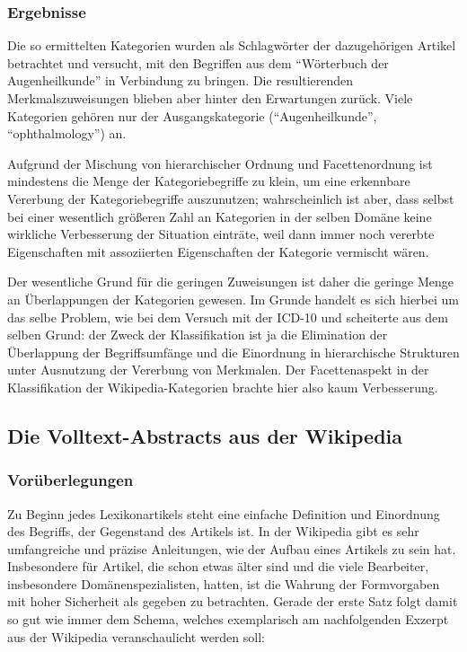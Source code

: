\documentclass[pagesize,DIV=calc,12pt,final]{scrreprt}
\begin{document}
\subsubsection{Ergebnisse}

Die so ermittelten Kategorien wurden als Schlagwörter der dazugehörigen Artikel betrachtet und versucht, mit den Begriffen aus dem \enquote{Wörterbuch der Augenheilkunde} in Verbindung zu bringen. 
Die resultierenden Merkmalszuweisungen blieben aber hinter den Erwartungen zurück. 
Viele Kategorien gehören nur der Ausgangskategorie (\enquote{Augenheilkunde}, \enquote{ophthalmology}) an. 

Aufgrund der Mischung von hierarchischer Ordnung und Facettenordnung ist mindestens die Menge der Kategoriebegriffe zu klein, um eine erkennbare Vererbung der Kategoriebegriffe auszunutzen; wahrscheinlich ist aber, dass selbst bei einer wesentlich größeren Zahl an Kategorien in der selben Domäne keine wirkliche Verbesserung der Situation einträte, weil dann immer noch vererbte Eigenschaften mit assoziierten Eigenschaften der Kategorie vermischt wären. 

Der wesentliche Grund für die geringen Zuweisungen ist daher die geringe Menge an Überlappungen der Kategorien gewesen. 
Im Grunde handelt es sich hierbei um das selbe Problem, wie bei dem Versuch mit der ICD-10 und scheiterte aus dem selben Grund: der Zweck der Klassifikation ist ja die Elimination der Überlappung der Begriffsumfänge und die Einordnung in hierarchische Strukturen unter Ausnutzung der Vererbung von Merkmalen. 
Der Facettenaspekt in der Klassifikation der Wikipedia-Kategorien brachte hier also kaum Verbesserung. 

\subsection{Die Volltext-Abstracts aus der Wikipedia}

\subsubsection{Vorüberlegungen}

Zu Beginn jedes Lexikonartikels steht eine einfache Definition und Einordnung des Begriffs, der Gegenstand des Artikels ist. 
In der Wikipedia gibt es sehr umfangreiche und präzise Anleitungen, wie der Aufbau eines Artikels zu sein hat. 
Insbesondere für Artikel, die schon etwas älter sind und die viele Bearbeiter, insbesondere Domänenspezialisten, hatten, ist die Wahrung der Formvorgaben mit hoher Sicherheit als gegeben zu betrachten. 
Gerade der erste Satz folgt damit so gut wie immer dem Schema, welches exemplarisch am nachfolgenden Exzerpt aus der Wikipedia veranschaulicht werden soll: 
\end{document}
